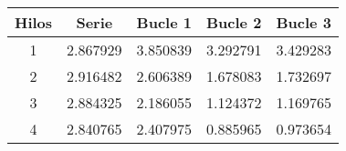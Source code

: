 \begin{tabular}{|c|c|c|c|c|}
\hline \textbf{Hilos} & \textbf{Serie} & \textbf{Bucle 1} & \textbf{Bucle 2} & \textbf{Bucle 3
}\\ 
\hline 1 & 2.867929 & 3.850839 & 3.292791 & 3.429283
\\ 
\hline 2 & 2.916482 & 2.606389 & 1.678083 & 1.732697
\\ 
\hline 3 & 2.884325 & 2.186055 & 1.124372 & 1.169765
\\ 
\hline 4 & 2.840765 & 2.407975 & 0.885965 & 0.973654
\\ 
\hline\end{tabular}